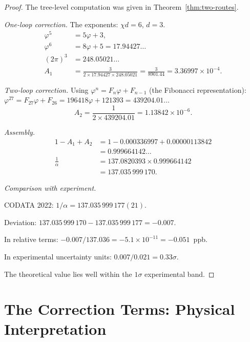 \documentclass[11pt,a4paper]{article}
\theoremstyle{plain}
\theoremstyle{definition}
\newcommand{\vp}{\varphi}
\begin{document}
\begin{proof}
The tree-level computation was given in Theorem~\ref{thm:two-routes}.

\smallskip\noindent\textit{One-loop correction.}
The exponents: $\chi d = 6$, $d = 3$.
\begin{align*}
  \vp^5 &= 5\vp + 3, \\
  \vp^6 &= 8\vp + 5 = 17.94427\ldots \\
  (2\pi)^3 &= 248.05021\ldots \\
  A_1 &= \frac{3}{2 \times 17.94427 \times 248.05021}
       = \frac{3}{8901.44}
       = 3.36997 \times 10^{-4}.
\end{align*}

\smallskip\noindent\textit{Two-loop correction.}
Using $\vp^n = F_n\vp + F_{n-1}$ (the Fibonacci representation):
$\vp^{27} = F_{27}\vp + F_{26} = 196418\vp + 121393 = 439204.01\ldots$
\[
  A_2 = \frac{1}{2 \times 439204.01} = 1.13842 \times 10^{-6}.
\]

\smallskip\noindent\textit{Assembly.}
\begin{align*}
  1 - A_1 + A_2
  &= 1 - 0.000336997 + 0.00000113842 \\
  &= 0.999664142\ldots \\[6pt]
  \frac{1}{\alpha}
  &= 137.0820393 \times 0.999664142 \\
  &= 137.035\,999\,170.
\end{align*}

\smallskip\noindent\textit{Comparison with experiment.}

CODATA 2022: $1/\alpha = 137.035\,999\,177(21)$.

Deviation: $137.035\,999\,170 - 137.035\,999\,177 = -0.007$.

In relative terms: $-0.007 / 137.036 = -5.1 \times 10^{-11} = -0.051$~ppb.

In experimental uncertainty units: $0.007 / 0.021 = 0.33\sigma$.

The theoretical value lies well within the $1\sigma$ experimental band.
\end{proof}

\section{The Correction Terms: Physical Interpretation}\label{sec:interpretation}
\end{document}
